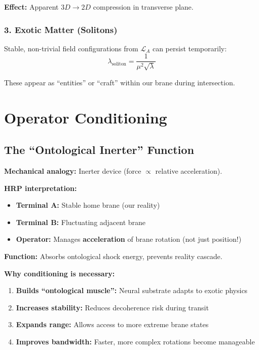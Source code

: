 \textbf{Effect:} Apparent $3D \rightarrow 2D$ compression in transverse plane.

\subsubsection{3. Exotic Matter (Solitons)}

Stable, non-trivial field configurations from $\mathcal{L}_A$ can persist temporarily:
\begin{equation}
\label{eq:soliton-length}
\lambda_{\text{soliton}} = \frac{1}{\mu^2\sqrt{\lambda}}
\end{equation}

These appear as ``entities'' or ``craft'' within our brane during intersection.

\section{Operator Conditioning}
\label{sec:conditioning}

\subsection{The ``Ontological Inerter'' Function}
\label{subsec:inerter}

\textbf{Mechanical analogy:} Inerter device (force $\propto$ relative acceleration).

\textbf{HRP interpretation:}
\begin{itemize}
\item \textbf{Terminal A:} Stable home brane (our reality)
\item \textbf{Terminal B:} Fluctuating adjacent brane
\item \textbf{Operator:} Manages \textbf{acceleration} of brane rotation (not just position!)
\end{itemize}

\textbf{Function:} Absorbs ontological shock energy, prevents reality cascade.

\textbf{Why conditioning is necessary:}
\begin{enumerate}
\item \textbf{Builds ``ontological muscle'':} Neural substrate adapts to exotic physics
\item \textbf{Increases stability:} Reduces decoherence risk during transit
\item \textbf{Expands range:} Allows access to more extreme brane states
\item \textbf{Improves bandwidth:} Faster, more complex rotations become manageable
\end{enumerate}

